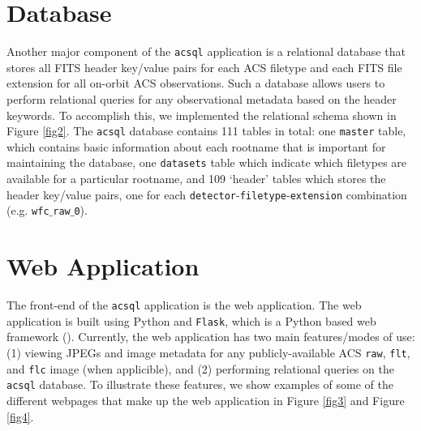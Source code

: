 \documentclass[11pt,twoside]{article}
\begin{document}


\section{Database}

Another major component of the \texttt{acsql} application is a relational database that stores all FITS header key/value pairs for
each ACS filetype and each FITS file extension for all on-orbit ACS observations.  Such a database allows users to perform relational queries for
any observational metadata based on the header keywords.  To accomplish this, we implemented the relational schema shown in Figure \ref{fig2}.
The \texttt{acsql} database contains 111 tables in total: one \texttt{master} table, which contains basic information about each rootname that is
important for maintaining the database, one \texttt{datasets} table which indicate which filetypes are available for a particular rootname, and 109
`header' tables which stores the header key/value pairs, one for each \texttt{detector}-\texttt{filetype}-\texttt{extension} combination
(e.g. \texttt{wfc$\_$raw$\_$0}).



\section{Web Application}

The front-end of the \texttt{acsql} application is the web application.  The web application is built using Python and \texttt{Flask}, which is a
Python based web framework (\citet{ronacher}).  Currently, the web application has two main features/modes of use: (1) viewing JPEGs and image
metadata for any publicly-available ACS \texttt{raw}, \texttt{flt}, and \texttt{flc} image (when applicible), and (2) performing relational queries
on the \texttt{acsql} database.  To illustrate these features, we show examples of some of the different webpages that make up the web application
in Figure \ref{fig3} and Figure \ref{fig4}.
\end{document}
